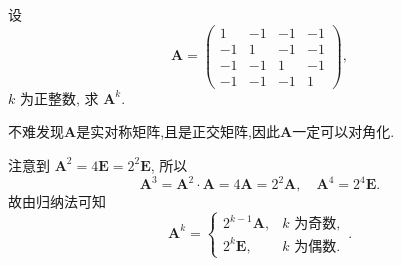 \documentclass[../../main.tex]{subfiles}
\begin{document}
\begin{example}
设
\[
\boldsymbol{A} = \begin{pmatrix} 1 & -1 & -1 & -1 \\ -1 & 1 & -1 & -1 \\ -1 & -1 & 1 & -1 \\ -1 & -1 & -1 & 1 \end{pmatrix},
\]
\(k\) 为正整数, 求 \(\boldsymbol{A}^k\).
\end{example}
\begin{remark}
不难发现$\boldsymbol{A}$是实对称矩阵,且是正交矩阵,因此$\boldsymbol{A}$一定可以对角化.
\end{remark}
\begin{solution}
注意到 \(\boldsymbol{A}^2 = 4\boldsymbol{E} = 2^2\boldsymbol{E}\), 所以
\[
\boldsymbol{A}^3 = \boldsymbol{A}^2 \cdot \boldsymbol{A} = 4\boldsymbol{A} = 2^2\boldsymbol{A}, \quad \boldsymbol{A}^4 = 2^4\boldsymbol{E}.
\]
故由归纳法可知
\[
\boldsymbol{A}^k = \begin{cases} 2^{k - 1}\boldsymbol{A}, & k \text{ 为奇数}, \\ 2^k\boldsymbol{E}, & k \text{ 为偶数}. \end{cases}.
\]
\end{solution}
\end{document}
